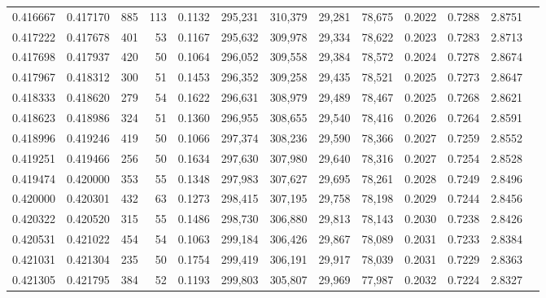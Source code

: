 \begin{tabular}{rrrrrrrrrrrrr}
0.416667 & 0.417170 &    885 &   113 &                                     0.1132 & 295,231 & 310,379 &  29,281 &  78,675 & 0.2022 & 0.7288 & 2.8751 \\
0.417222 & 0.417678 &    401 &    53 &                                     0.1167 & 295,632 & 309,978 &  29,334 &  78,622 & 0.2023 & 0.7283 & 2.8713 \\
0.417698 & 0.417937 &    420 &    50 &                                     0.1064 & 296,052 & 309,558 &  29,384 &  78,572 & 0.2024 & 0.7278 & 2.8674 \\
0.417967 & 0.418312 &    300 &    51 &                                     0.1453 & 296,352 & 309,258 &  29,435 &  78,521 & 0.2025 & 0.7273 & 2.8647 \\
0.418333 & 0.418620 &    279 &    54 &                                     0.1622 & 296,631 & 308,979 &  29,489 &  78,467 & 0.2025 & 0.7268 & 2.8621 \\
0.418623 & 0.418986 &    324 &    51 &                                     0.1360 & 296,955 & 308,655 &  29,540 &  78,416 & 0.2026 & 0.7264 & 2.8591 \\
0.418996 & 0.419246 &    419 &    50 &                                     0.1066 & 297,374 & 308,236 &  29,590 &  78,366 & 0.2027 & 0.7259 & 2.8552 \\
0.419251 & 0.419466 &    256 &    50 &                                     0.1634 & 297,630 & 307,980 &  29,640 &  78,316 & 0.2027 & 0.7254 & 2.8528 \\
0.419474 & 0.420000 &    353 &    55 &                                     0.1348 & 297,983 & 307,627 &  29,695 &  78,261 & 0.2028 & 0.7249 & 2.8496 \\
0.420000 & 0.420301 &    432 &    63 &                                     0.1273 & 298,415 & 307,195 &  29,758 &  78,198 & 0.2029 & 0.7244 & 2.8456 \\
0.420322 & 0.420520 &    315 &    55 &                                     0.1486 & 298,730 & 306,880 &  29,813 &  78,143 & 0.2030 & 0.7238 & 2.8426 \\
0.420531 & 0.421022 &    454 &    54 &                                     0.1063 & 299,184 & 306,426 &  29,867 &  78,089 & 0.2031 & 0.7233 & 2.8384 \\
0.421031 & 0.421304 &    235 &    50 &                                     0.1754 & 299,419 & 306,191 &  29,917 &  78,039 & 0.2031 & 0.7229 & 2.8363 \\
0.421305 & 0.421795 &    384 &    52 &                                     0.1193 & 299,803 & 305,807 &  29,969 &  77,987 & 0.2032 & 0.7224 & 2.8327 \\

\end{tabular}
